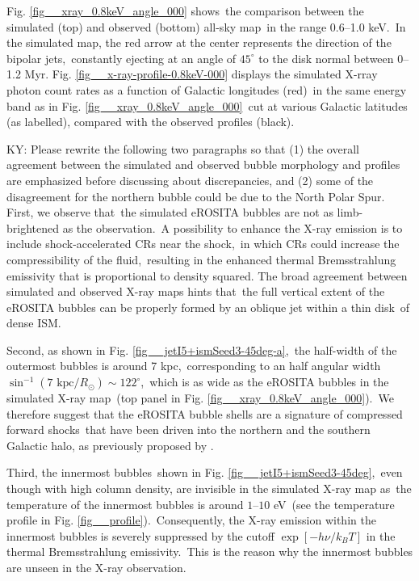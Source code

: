 \documentclass[fleqn,usenatbib,useAMS]{mnras}
\begin{document}
  Fig. \ref{fig__xray_0.8keV_angle_000} shows\
  the comparison between the simulated (top) and observed (bottom) all-sky map\
  in the range 0.6--1.0 keV.\
  In the simulated map, the red arrow at the center represents the direction of the bipolar jets,\
  constantly ejecting at an angle of $45^{\circ}$ to the disk normal between 0--1.2 Myr. Fig. \ref{fig__x-ray-profile-0.8keV-000} displays the simulated X-rray photon count rates as a function of Galactic longitudes (red)\
  in the same energy band as in Fig. \ref{fig__xray_0.8keV_angle_000}\
  cut at various Galactic latitudes (as labelled), compared with the observed profiles (black).

  {\color{red} KY: Please rewrite the following two paragraphs so that (1) the overall agreement between the simulated and observed bubble morphology and profiles are emphasized before discussing about discrepancies, and (2) some of the disagreement for the northern bubble could be due to the North Polar Spur.}
  First, we observe that\
  the simulated eROSITA bubbles are not as limb-brightened as the observation.\
  A possibility to enhance the X-ray emission is to include shock-accelerated CRs near the shock,\
  in which CRs could increase the compressibility of the fluid,\
  resulting in the enhanced thermal Bremsstrahlung emissivity that is proportional to density squared.
  The broad agreement between simulated and observed X-ray maps hints that\
  the full vertical extent of the eROSITA bubbles can be properly formed by an oblique jet within a thin disk\
  of dense ISM.

  Second, as shown in Fig. \ref{fig__jetI5+ismSeed3-45deg-a},\
  the half-width of the outermost bubbles is around 7 kpc,\
  corresponding to an half angular width $\sin^{-1}(7 \text{ kpc}/R_{\odot})\sim122^{\circ}$,\
  which is as wide as the eROSITA bubbles in the simulated X-ray map\
  (top panel in Fig. \ref{fig__xray_0.8keV_angle_000}).\
  We therefore suggest that the eROSITA bubble shells are a signature of compressed forward shocks\
  that have been driven into the northern and the southern Galactic halo,
  as previously proposed by \citet{Predehl2020}.


  Third, the innermost bubbles\
  shown in Fig. \ref{fig__jetI5+ismSeed3-45deg},\
  even though with high column density, are invisible in the simulated X-ray map as\
  the temperature of the innermost bubbles is around $1$--$10$ eV\
  (see the temperature profile in Fig. \ref{fig__profile}).\
  Consequently, the X-ray emission within the innermost bubbles
  is severely suppressed by the cutoff $\exp\left[-h\nu/k_{B}T\right]$ in the thermal Bremsstrahlung emissivity.\
  This is the reason why the innermost bubbles are unseen in the X-ray observation.
\end{document}
